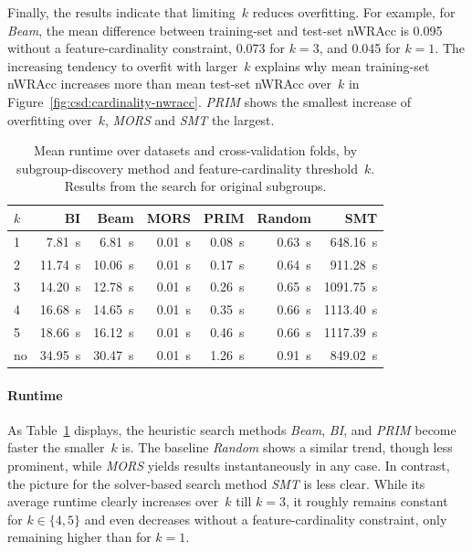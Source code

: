 \documentclass{article}
\theoremstyle{definition}
\begin{document}
Finally, the results indicate that limiting~$k$ reduces overfitting.
For example, for \emph{Beam}, the mean difference between training-set and test-set nWRAcc is 0.095 without a feature-cardinality constraint, 0.073 for $k=3$, and 0.045 for $k=1$.
The increasing tendency to overfit with larger~$k$ explains why mean training-set nWRAcc increases more than mean test-set nWRAcc over~$k$ in Figure~\ref{fig:csd:cardinality-nwracc}.
\emph{PRIM} shows the smallest increase of overfitting over~$k$, \emph{MORS} and \emph{SMT} the largest.

\begin{table}[t]
	\centering
	\begin{tabular}{lrrrrrr}
		\toprule
		$k$ & BI & Beam & MORS & PRIM & Random & SMT \\
		\midrule
		1 & 7.81~s & 6.81~s & 0.01~s & 0.08~s & 0.63~s & 648.16~s \\
		2 & 11.74~s & 10.06~s & 0.01~s & 0.17~s & 0.64~s & 911.28~s \\
		3 & 14.20~s & 12.78~s & 0.01~s & 0.26~s & 0.65~s & 1091.75~s \\
		4 & 16.68~s & 14.65~s & 0.01~s & 0.35~s & 0.66~s & 1113.40~s \\
		5 & 18.66~s & 16.12~s & 0.01~s & 0.46~s & 0.66~s & 1117.39~s \\
		no & 34.95~s & 30.47~s & 0.01~s & 1.26~s & 0.91~s & 849.02~s \\
		\bottomrule
	\end{tabular}
	\caption{
		Mean runtime over datasets and cross-validation folds, by subgroup-discovery method and feature-cardinality threshold~$k$.
		Results from the search for original subgroups.
	}
	\label{tab:csd:cardinality-runtime}
\end{table}

\paragraph{Runtime}

As Table~\ref{tab:csd:cardinality-runtime} displays, the heuristic search methods \emph{Beam}, \emph{BI}, and \emph{PRIM} become faster the smaller~$k$ is.
The baseline \emph{Random} shows a similar trend, though less prominent, while \emph{MORS} yields results instantaneously in any case.
In contrast, the picture for the solver-based search method \emph{SMT} is less clear.
While its average runtime clearly increases over~$k$ till $k=3$, it roughly remains constant for $k \in \{4, 5\}$ and even decreases without a feature-cardinality constraint, only remaining higher than for $k = 1$.
\end{document}
